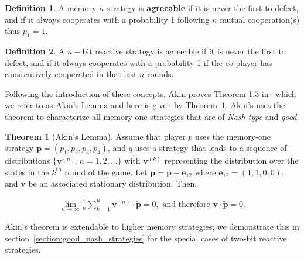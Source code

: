 \documentclass{article}
\theoremstyle{definition}
\newtheorem{definition}{Definition}[section]
\newtheorem{theorem}{Theorem}[section]
\begin{document}
\begin{definition}\label{definition:memn_agreeable}
  A memory-\(n\) strategy is \textbf{agreeable} if it is never the first to defect,
  and if it always cooperates with a probability 1 following \(n\) mutual cooperation(s) thus
  \(p_1=1\).
\end{definition}

\begin{definition}\label{definition:nbit_agreeable} A \(n-\)bit reactive strategy is
agreeable if it is never the first to defect,
and if it always cooperates with a probability 1 if the co-player has consecutively cooperated in that last \(n\) rounds.
\end{definition}

Following the introduction of these concepts, Akin proves Theorem 1.3
in~\citep{akin:EGADS:2016} which we refer to as Akin's Lemma and here is given
by Theorem~\ref{theorem:akin}. Akin's uses the theorem to characterize all memory-one
strategies that are of \textit{Nash type} and \textit{good}.

\begin{theorem}[Akin's Lemma]\label{theorem:akin}
  Assume that player \(p\) uses the memory-one strategy \(\mathbf{p}=(p_1, p_2, p_3, p_4)\),
  and \(q\) uses a strategy that leads to a sequence
  of distributions \(\{\mathbf{v}^{(n)}, n = 1, 2, ...\}\) with \(\mathbf{v}^{(k)}\) representing the
  distribution over the states in the \(k^{\text{th}}\) round of the game. Let  \(\mathbf{\tilde{p}} = \mathbf{p} - \mathbf{e}_{12}\) where
  \(\mathbf{e}_{12} = (1, 1, 0, 0)\), and
  \(\mathbf{v}\) be an associated stationary distribution. Then,

  \begin{align}
    \lim_{n \rightarrow \infty} \frac{1}{n} \sum_{k=1}^{n} \mathbf{v}^{(n)} \cdot \mathbf{\tilde{p}} = 0, \text{ and therefore } \mathbf{v} \cdot \mathbf{\tilde{p}} = 0.
  \end{align}
\end{theorem}

Akin's theorem is extendable to higher memory strategies; we demonstrate this in section~\ref{section:good_nash_strategies}
for the special cases of two-bit reactive strategies.
\end{document}
